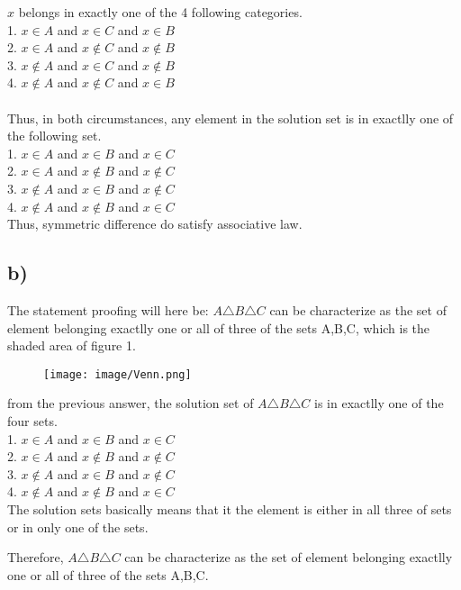 \documentclass[a4paper,fleqn]{article}
\begin{document}
            \(x\) belongs in exactly one of the 4 following categories. \\
            1. \(x\in A\) and \(x\in C\) and \(x\in B\)\\
            2. \(x\in A\) and \(x\notin C\) and \(x\notin B\)\\
            3. \(x\notin A\) and \(x \in C\) and \(x \notin B\)\\
            4. \(x\notin A\) and \(x\notin C\) and \(x\in B\)\\
            \\
            Thus, in both circumstances, any element in the solution set is in exactlly one of the following set.\\
            1. \(x\in A\) and \(x\in B\) and \(x\in C\)\\
            2. \(x\in A\) and \(x\notin B\) and \(x\notin C\)\\
            3. \(x\notin A\) and \(x\in B\) and \(x\notin C\)\\
            4. \(x\notin A\) and \(x\notin B\) and \(x\in C\)\\
            Thus, symmetric difference do satisfy associative law.
            


\newpage
    \subsection*{b)}
        The statement proofing will here be: \(A\triangle B \triangle C\) 
        can be characterize as the set of element belonging exactlly one or all of three of the sets A,B,C, which is the shaded area of figure 1.
        \begin{figure}[h]
            \centering
            \texttt{[image: image/Venn.png]}
            \caption{}
        \end{figure}
        
        from the previous answer, the solution set of \(A\triangle B \triangle C\) is in exactlly one of the four sets.\\
            1. \(x\in A\) and \(x\in B\) and \(x\in C\)\\
            2. \(x\in A\) and \(x\notin B\) and \(x\notin C\)\\
            3. \(x\notin A\) and \(x\in B\) and \(x\notin C\)\\
            4. \(x\notin A\) and \(x\notin B\) and \(x\in C\)\\
            The solution sets basically means that it the element is either in all three of sets or in only one of the sets.
            
        Therefore, \(A\triangle B \triangle C\) 
        can be characterize as the set of element belonging exactlly one or all of three of the sets A,B,C.
\end{document}

